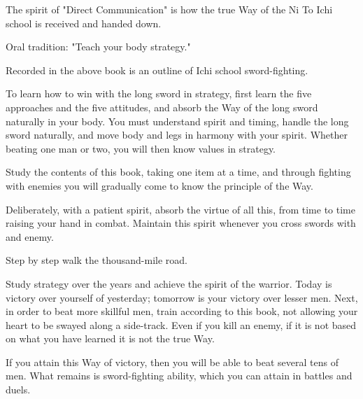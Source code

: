 The spirit of "Direct Communication" is how the true Way of the Ni To Ichi school is received and handed down.

Oral tradition: "Teach your body strategy."

Recorded in the above book is an outline of Ichi school sword-fighting.

To learn how to win with the long sword in strategy, first learn the five approaches and the five attitudes, and absorb the Way of the long sword naturally in your body. You must understand spirit and timing, handle the long sword naturally, and move body and legs in harmony with your spirit. Whether beating one man or two, you will then know values in strategy.

Study the contents of this book, taking one item at a time, and through fighting with enemies you will gradually come to know the principle of the Way.

Deliberately, with a patient spirit, absorb the virtue of all this, from time to time raising your hand in combat. Maintain this spirit whenever you cross swords with and enemy.

Step by step walk the thousand-mile road.

Study strategy over the years and achieve the spirit of the warrior. Today is victory over yourself of yesterday; tomorrow is your victory over lesser men. Next, in order to beat more skillful men, train according to this book, not allowing your heart to be swayed along a side-track. Even if you kill an enemy, if it is not based on what you have learned it is not the true Way.

If you attain this Way of victory, then you will be able to beat several tens of men. What remains is sword-fighting ability, which you can attain in battles and duels. 
